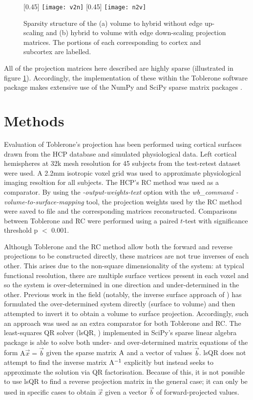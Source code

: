 \begin{figure}[H]
\centering
\subcaptionbox{\label{v2n_mat}}[0.45\textwidth]
{\texttt{[image: v2n]}}
\subcaptionbox{\label{n2v_mat}}[0.45\textwidth]
{\texttt{[image: n2v]}}
\caption{Sparsity structure of the (a) volume to hybrid without edge up-scaling and (b) hybrid to volume with edge down-scaling projection matrices. The portions of each corresponding to cortex and subcortex are labelled.} 
\label{sparsity}
\end{figure}

All of the projection matrices here described are highly sparse (illustrated in figure \ref{sparsity}). Accordingly, the implementation of these within the Toblerone software package makes extensive use of the NumPy and SciPy sparse matrix packages \cite{Walt2011, Virtanen2020}.


\section{Methods}
Evaluation of Toblerone's projection has been performed using cortical surfaces drawn from the HCP database \cite{HCP_data, Glasser2013} and simulated physiological data. Left cortical hemispheres at 32k mesh resolution for 45 subjects from the test-retest dataset were used. A 2.2mm isotropic voxel grid was used to approximate physiological imaging resoltion for all subjects. The HCP's RC method was used as a comparator. By using the \textit{-output-weights-text} option with the \textit{wb\_command -volume-to-surface-mapping} tool, the projection weights used by the RC method were saved to file and the corresponding matrices reconstructed. Comparisons between Toblerone and RC were performed using a paired $t$-test with significance threshold p $<$ 0.001. 

Although Toblerone and the RC method allow both the forward and reverse projections to be constructed directly, these matrices are not true inverses of each other. This arises due to the non-square dimensionality of the system: at typical functional resolution, there are multiple surface vertices present in each voxel and so the system is over-determined in one direction and under-determined in the other. Previous work in the field (notably, the inverse surface approach of \cite{Lonjaret2017}) has formulated the over-determined system directly (surface to volume) and then attempted to invert it to obtain a volume to surface projection. Accordingly, such an approach was used as an extra comparator for both Toblerone and RC. The least-squares QR solver (lsQR, \cite{10.1145/355984.355989}) implemented in SciPy's sparse linear algebra package is able to solve both under- and over-determined matrix equations of the form $\mathrm{A}\vec{x} = \vec{b}$ given the sparse matrix $\mathrm{A}$ and a vector of values $\vec{b}$. lsQR does not attempt to find the inverse matrix $\mathrm{A}^{-1}$ explicitly but instead seeks to approximate the solution via QR factorisation. Because of this, it is not possible to use lsQR to find a reverse projection matrix in the general case; it can only be used in specific cases to obtain $\vec{x}$ given a vector $\vec{b}$ of forward-projected values. 

